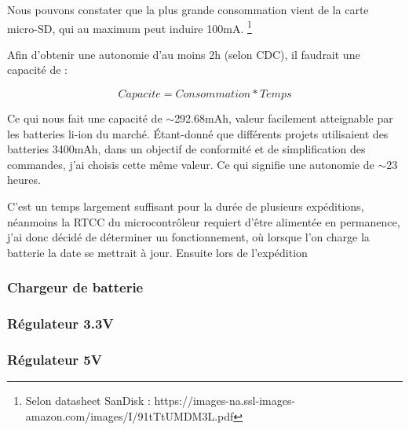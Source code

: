 {{		\begin{center}
			   \fbox{\textit{\textcolor{red}{Carte-SD - 100mA}}}   
		\end{center}
		
		Nous pouvons constater que la plus grande consommation vient de la carte micro-SD, qui au maximum peut induire 100mA. \footnote{Selon datasheet SanDisk : https://images-na.ssl-images-amazon.com/images/I/91tTtUMDM3L.pdf}
		
		
		Afin d'obtenir une autonomie d'au moins 2h (selon CDC), il faudrait une capacité de :
		
		\begin{equation}
			Capacite = Consommation * Temps
		\end{equation}
		
		Ce qui nous fait une capacité de $\sim$292.68mAh, valeur facilement atteignable par les batteries li-ion du marché. Étant-donné que différents projets utilisaient des batteries 3400mAh, dans un objectif de conformité et de simplification des commandes, j'ai choisis cette même valeur.
		Ce qui signifie une autonomie de $\sim$23 heures.
		
		C'est un temps largement suffisant pour la durée de plusieurs expéditions, néanmoins la RTCC du microcontrôleur requiert d'être alimentée en permanence, j'ai donc décidé de déterminer un fonctionnement, où lorsque l'on charge la batterie la date se mettrait à jour. Ensuite lors de l'expédition  
	}

	\clearpage
	\subsubsection{Chargeur de batterie} \label{sssec:BatCharger}
	{
		
	}
	
	\subsubsection{Régulateur 3.3V} \label{sssec:Reg3V3}
	{
		
	}
	
	\subsubsection{Régulateur 5V} \label{sssec:Reg5V}
	{
		
	}
	

}

\clearpage